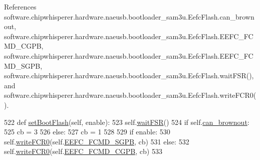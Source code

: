 References software.\+chipwhisperer.\+hardware.\+naeusb.\+bootloader\+\_\+sam3u.\+Eefc\+Flash.\+can\+\_\+brownout, software.\+chipwhisperer.\+hardware.\+naeusb.\+bootloader\+\_\+sam3u.\+Eefc\+Flash.\+E\+E\+F\+C\+\_\+\+F\+C\+M\+D\+\_\+\+C\+G\+P\+B, software.\+chipwhisperer.\+hardware.\+naeusb.\+bootloader\+\_\+sam3u.\+Eefc\+Flash.\+E\+E\+F\+C\+\_\+\+F\+C\+M\+D\+\_\+\+S\+G\+P\+B, software.\+chipwhisperer.\+hardware.\+naeusb.\+bootloader\+\_\+sam3u.\+Eefc\+Flash.\+wait\+F\+S\+R(), and software.\+chipwhisperer.\+hardware.\+naeusb.\+bootloader\+\_\+sam3u.\+Eefc\+Flash.\+write\+F\+C\+R0().


\begin{DoxyCode}
522     \textcolor{keyword}{def }\hyperlink{classsoftware_1_1chipwhisperer_1_1hardware_1_1naeusb_1_1bootloader__sam3u_1_1EefcFlash_a2a90e58b335bb87704aecb82c57d7b4a}{setBootFlash}(self, enable):
523         self.\hyperlink{classsoftware_1_1chipwhisperer_1_1hardware_1_1naeusb_1_1bootloader__sam3u_1_1EefcFlash_af9c2a803cf623aa2ceeabeab912aa8b5}{waitFSR}()
524         \textcolor{keywordflow}{if} self.\hyperlink{classsoftware_1_1chipwhisperer_1_1hardware_1_1naeusb_1_1bootloader__sam3u_1_1EefcFlash_a2a7305c795772d47fd04a1f3b5bcb3ab}{can\_brownout}:
525             cb = 3
526         \textcolor{keywordflow}{else}:
527             cb = 1
528 
529         \textcolor{keywordflow}{if} enable:
530             self.\hyperlink{classsoftware_1_1chipwhisperer_1_1hardware_1_1naeusb_1_1bootloader__sam3u_1_1EefcFlash_aa255adaa75a4bd666c3b290b573ae7dd}{writeFCR0}(self.\hyperlink{classsoftware_1_1chipwhisperer_1_1hardware_1_1naeusb_1_1bootloader__sam3u_1_1EefcFlash_a446018c934d09ce9dcf6bbee40708f81}{EEFC\_FCMD\_SGPB}, cb)
531         \textcolor{keywordflow}{else}:
532             self.\hyperlink{classsoftware_1_1chipwhisperer_1_1hardware_1_1naeusb_1_1bootloader__sam3u_1_1EefcFlash_aa255adaa75a4bd666c3b290b573ae7dd}{writeFCR0}(self.\hyperlink{classsoftware_1_1chipwhisperer_1_1hardware_1_1naeusb_1_1bootloader__sam3u_1_1EefcFlash_ad1509f6e5a145686678d0c46c85582fe}{EEFC\_FCMD\_CGPB}, cb)
533 
\end{DoxyCode}
\hypertarget{classsoftware_1_1chipwhisperer_1_1hardware_1_1naeusb_1_1bootloader__sam3u_1_1EefcFlash_a0faa881b52a5d49714c358544184ae94}{}
